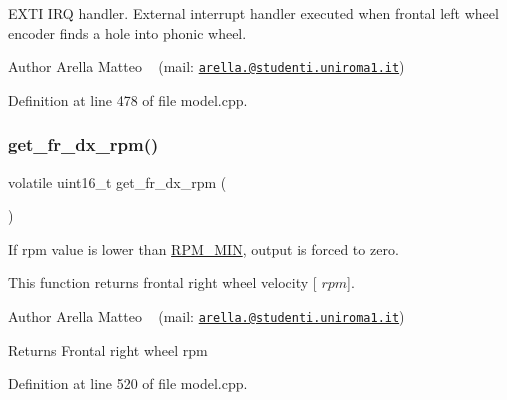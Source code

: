 E\+X\+TI I\+RQ handler. External interrupt handler executed when frontal left wheel encoder finds a hole into phonic wheel. 

\begin{DoxyAuthor}{Author}
Arella Matteo ~\newline
 (mail\+: \href{mailto:arella.1646983@studenti.uniroma1.it}{\tt arella.@studenti.\+uniroma1.\+it}) 
\end{DoxyAuthor}


Definition at line 478 of file model.\+cpp.

\mbox{\label{group___board__model__group_ga3f71b1feaa9b3356080597de5de12f7b}} 
\subsubsection{\texorpdfstring{get\+\_\+fr\+\_\+dx\+\_\+rpm()}{get\_fr\_dx\_rpm()}}
{\footnotesize\ttfamily volatile uint16\+\_\+t get\+\_\+fr\+\_\+dx\+\_\+rpm (\begin{DoxyParamCaption}{ }\end{DoxyParamCaption})}



If rpm value is lower than \mbox{\hyperlink{group___board__model__group_gafc05771487f188ffa40b6620afc1a9bc}{R\+P\+M\+\_\+\+M\+IN}}, output is forced to zero. 

This function returns frontal right wheel velocity \mbox{[} $rpm$\mbox{]}.

\begin{DoxyAuthor}{Author}
Arella Matteo ~\newline
 (mail\+: \href{mailto:arella.1646983@studenti.uniroma1.it}{\tt arella.@studenti.\+uniroma1.\+it})
\end{DoxyAuthor}
\begin{DoxyReturn}{Returns}
Frontal right wheel rpm 
\end{DoxyReturn}


Definition at line 520 of file model.\+cpp.

\mbox{\label{group___board__model__group_ga77eb7343baa6cbfd81673dcbd03ac125}} 
